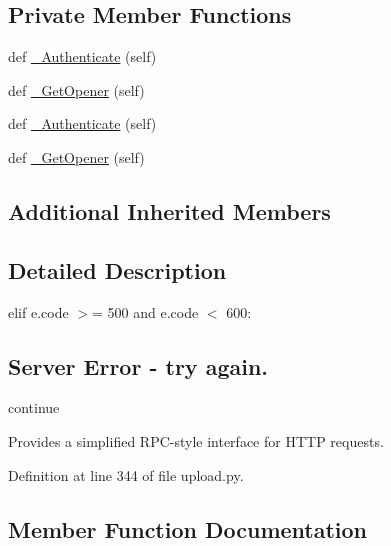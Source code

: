 \subsection*{Private Member Functions}
\begin{DoxyCompactItemize}
\item 
def \hyperlink{classupload_1_1HttpRpcServer_ab46a30c5aaa9f4d8f5a4bcb32293010e}{\+\_\+\+Authenticate} (self)
\item 
def \hyperlink{classupload_1_1HttpRpcServer_a4685030df704ec17f020c8790108a05a}{\+\_\+\+Get\+Opener} (self)
\item 
def \hyperlink{classupload_1_1HttpRpcServer_ab46a30c5aaa9f4d8f5a4bcb32293010e}{\+\_\+\+Authenticate} (self)
\item 
def \hyperlink{classupload_1_1HttpRpcServer_a4685030df704ec17f020c8790108a05a}{\+\_\+\+Get\+Opener} (self)
\end{DoxyCompactItemize}
\subsection*{Additional Inherited Members}


\subsection{Detailed Description}
elif e.\+code $>$= 500 and e.\+code $<$ 600\+: \subsection*{Server Error -\/ try again.}

continue \begin{DoxyVerb}Provides a simplified RPC-style interface for HTTP requests.\end{DoxyVerb}
 

Definition at line 344 of file upload.\+py.



\subsection{Member Function Documentation}
\mbox{\label{classupload_1_1HttpRpcServer_ab46a30c5aaa9f4d8f5a4bcb32293010e}} 
